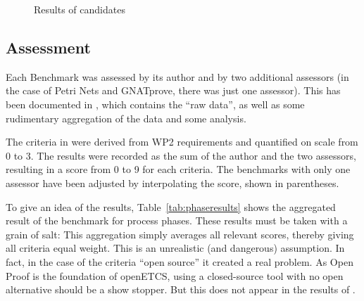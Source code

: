  \begin{figure}
  \centering
  \caption{Results of candidates}
  \label{fig:results}
\end{figure}

\subsection{Assessment}
\label{sec:assessment}

Each Benchmark was assessed by its author and by two additional assessors (in the case of Petri Nets and GNATprove, there was just one assessor).  This has been documented in \citep{WP7_O719}, which contains the ``raw data'', as well as some rudimentary aggregation of the data and some analysis.

The criteria in \citep{WP7_O719} were derived from WP2 requirements and quantified on scale from 0 to 3.  The results were recorded as the sum of the author and the two assessors, resulting in a score from 0 to 9 for each criteria.  The benchmarks with only one assessor have been adjusted by interpolating the score, shown in parentheses.

To give an idea of the results, Table~\ref{tab:phaseresults} shows the aggregated result of the benchmark for process phases.  These results must be taken with a grain of salt: This aggregation simply averages all relevant scores, thereby giving all criteria equal weight.  This is an unrealistic (and dangerous) assumption.  In fact, in the case of the criteria ``open source'' it created a real problem.  As Open Proof is the foundation of openETCS, using a closed-source tool with no open alternative should be a show stopper.  But this does not appear in the results of \citep{WP7_O719}.

